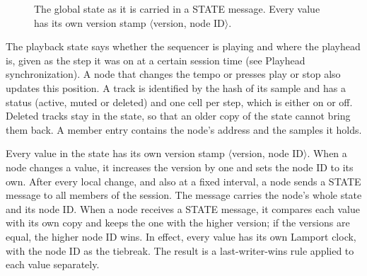 \documentclass{article}
\newcommand{\lofisfld}[5][]{\node[draw=black!55, fill=white, rounded corners=1pt, minimum width=#4cm, minimum height=0.5cm, inner sep=2pt, font=\footnotesize, #1] at (#2,#3) {#5};}
\newcommand{\lofistamp}[2]{\textcolor{stampc}{$\langle$#1, #2$\rangle$}}
\newcommand{\lofifld}[6][]{\node[draw=black!55, fill=white, rounded corners=1pt, minimum width=#4cm, minimum height=0.62cm, inner sep=1pt, align=center, font=\footnotesize, #1] at (#2,#3) {#5\\[-2pt]{\scriptsize\color{black!60}#6}};}
\newcommand{\loficell}[4]{\pgfmathsetmacro\cx{4.2+#1*0.88+floor(#1/4)*0.14+0.41}\node[#3, minimum width=0.82cm, minimum height=0.62cm, inner sep=0, rounded corners=1pt, align=center, font=\scriptsize] at (\cx,#2) {#3\\[-2pt]{\color{.!75}#4}};}
\begin{document}
\begin{figure}[htbp]
{}
\caption{The global state as it is carried in a STATE message. Every value has its own version stamp $\langle$version, node ID$\rangle$.}
\label{fig:state_message}
\end{figure}

The playback state says whether the sequencer is playing and where the playhead is, given as the step it was on at a certain session time (see Playhead synchronization). A node that changes the tempo or presses play or stop also updates this position. A track is identified by the hash of its sample and has a status (active, muted or deleted) and one cell per step, which is either on or off. Deleted tracks stay in the state, so that an older copy of the state cannot bring them back. A member entry contains the node's address and the samples it holds.

Every value in the state has its own version stamp $\langle$version, node ID$\rangle$. When a node changes a value, it increases the version by one and sets the node ID to its own. After every local change, and also at a fixed interval, a node sends a STATE message to all members of the session. The message carries the node's whole state and its node ID. When a node receives a STATE message, it compares each value with its own copy and keeps the one with the higher version; if the versions are equal, the higher node ID wins. In effect, every value has its own Lamport clock, with the node ID as the tiebreak. The result is a last-writer-wins rule applied to each value separately.
\end{document}
